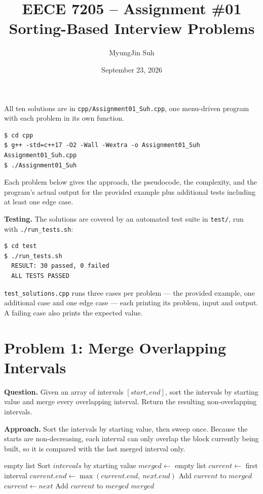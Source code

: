 \documentclass[11pt]{article}
\title{\textbf{EECE 7205 -- Assignment \#01}\\[0.3em]
       \large Sorting-Based Interview Problems}
\author{MyungJin Suh}
\date{September 23, 2026}
\begin{document}
\maketitle

All ten solutions are in \texttt{cpp/Assignment01\_Suh.cpp}, one menu-driven
program with each problem in its own function.

\begin{lstlisting}[style=term]
$ cd cpp
$ g++ -std=c++17 -O2 -Wall -Wextra -o Assignment01_Suh Assignment01_Suh.cpp
$ ./Assignment01_Suh
\end{lstlisting}

Each problem below gives the approach, the pseudocode, the complexity, and the
program's actual output for the provided example plus additional tests
including at least one edge case.

\textbf{Testing.} The solutions are covered by an automated test suite in
\texttt{test/}, run with \texttt{./run\_tests.sh}:

\begin{lstlisting}[style=term]
$ cd test
$ ./run_tests.sh
  RESULT: 30 passed, 0 failed
  ALL TESTS PASSED
\end{lstlisting}

\texttt{test\_solutions.cpp} runs three cases per problem --- the provided
example, one additional case and one edge case --- each printing its problem,
input and output. A failing case also prints the expected value.

\newpage

\section*{Problem 1: Merge Overlapping Intervals}
\textbf{Question.} Given an array of intervals $[start, end]$, sort the intervals by starting value and merge every overlapping interval. Return the resulting non-overlapping intervals.

\textbf{Approach.} Sort the intervals by starting value, then sweep once. Because the starts are non-decreasing, each interval can only overlap the block currently being built, so it is compared with the last merged interval only.

\begin{algorithm}[H]
\caption{Merge Overlapping Intervals}
\begin{algorithmic}[1]
        \State \Return empty list
    \EndIf
    \State Sort $intervals$ by starting value
    \State $merged \gets$ empty list
    \State $current \gets$ first interval
            \State $current.end \gets \max(current.end,\ next.end)$
        \Else
            \State Add $current$ to $merged$
            \State $current \gets next$
        \EndIf
    \EndFor
    \State Add $current$ to $merged$
    \State \Return $merged$
\EndFunction
\end{algorithmic}
\end{algorithm}
\end{document}
